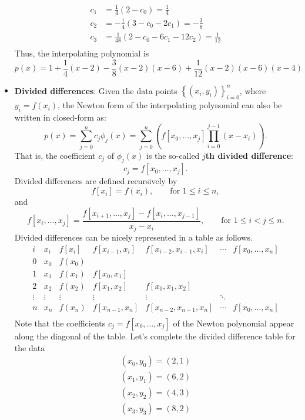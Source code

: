\documentclass{report}
\begin{document}
\begin{itemize}
$$\begin{align}
        c_1 &= \frac{1}{4} (2 - c_0) = \frac{1}{4} 
        \\
        c_2 &= -\frac{1}{4}(3 - c_0 - 2 c_1) =  -\frac38
        \\
        c_3 &= \frac{1}{48}(2 - c_0 - 6 c_1 - 12 c_2) = \frac{1}{12}
        \\
    \end{align}
    $$
    \bigbreak \noindent 
    Thus, the interpolating polynomial is 
    $$
    p(x) = 1 + \frac14(x-2) - \frac38(x-2)(x-6) + \frac{1}{12}(x-2)(x-6)(x-4)
    $$
\item \textbf{Divided differences}:
    Given the data points $\left\{(x_i,y_i)\right\}_{i=0}^n$, where $y_i = f(x_i)$, the Newton form of the interpolating polynomial can also be written in closed-form as:
$$p(x) = \sum_{j=0}^n c_j \phi_j(x) = \sum_{j=0}^n \left( f[x_0,\ldots,x_j] \prod_{i=0}^{j-1}(x-x_i) \right).$$
That is, the coefficient $c_j$ of $\phi_j(x)$ is the so-called \textbf{$j$th divided difference}:
$$c_j = f[x_0,\ldots,x_j].$$
Divided differences are defined recursively by
$$f[x_i] = f(x_i), \qquad \text{for } 1\leq i \leq n,$$
and
$$f[x_i,\ldots,x_j] = \frac{f[x_{i+1},\ldots,x_j] - f[x_i,\ldots,x_{j-1}]}{x_j - x_i}, \qquad \text{for } 1\leq i < j \leq n.$$
\bigbreak \noindent 
Divided differences can be nicely represented in a table as follows.
$$
\begin{array}{c||c|ccccc}
i & x_i & f[x_i] & f[x_{i-1},x_i] & f[x_{i-2},x_{i-1},x_i] & \cdots & f[x_0,\ldots,x_n] \\ \hline
0 & x_0 & f(x_0) \\
1 & x_1 & f(x_1) & f[x_0,x_1] \\
2 & x_2 & f(x_2) & f[x_1,x_2] & f[x_0,x_1,x_2] \\
\vdots & \vdots & \vdots & \vdots & \vdots & \ddots  \\
n & x_n & f(x_n) & f[x_{n-1},x_n] & f[x_{n-2},x_{n-1},x_n] & \cdots & f[x_0,\ldots,x_n] \\
\end{array}
$$
Note that the coefficients $c_j = f[x_0,\ldots,x_j]$ of the Newton polynomial appear along the diagonal of the table.
\bigbreak \noindent 
Let's complete the divided difference table for the data
\begin{align*}
    (x_0,y_0) = (2,1)\\
    (x_1,y_1) = (6,2)\\
    (x_2, y_2) = (4,3)\\
    (x_3, y_3) = (8,2)\\
\end{align*}

\end{itemize}
\end{document}
